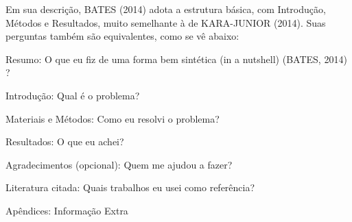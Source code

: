 \documentclass[
12pt,		%
openright,	%
twoside,  %
a4paper,			%
chapter=TITLE,		%
english,			%
french,				%
spanish,			%
brazil				%
]{USPSC-classe/USPSC}
\begin{document}
Em sua descri\c{c}\~ao, BATES (2014)  adota a estrutura b\'asica, com \textquotedbl Introdu\c{c}\~ao, M\'etodos e Resultados\textquotedbl , muito semelhante \`a de KARA-JUNIOR (2014). Suas perguntas tamb\'em s\~ao equivalentes, como se v\^e abaixo:











\begin{alineas}
\item Resumo: O que eu fiz de uma forma bem sint\'etica (\textquotedbl in a nutshell\textquotedbl ) (BATES, 2014) ?
\item Introdu\c{c}\~ao: Qual \'e o problema?
\item Materiais e M\'etodos: Como eu resolvi o problema?
\item Resultados: O que eu achei?
\item Agradecimentos (opcional): Quem me ajudou a fazer?
\item Literatura citada: Quais trabalhos eu usei como refer\^encia?
\item Ap\^endices: Informa\c{c}\~ao Extra
\end{alineas}
\end{document}

